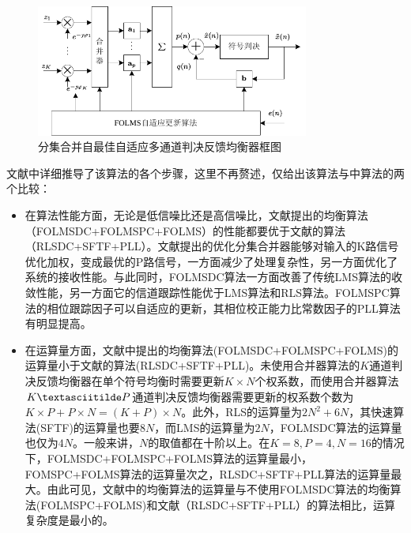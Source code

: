 \begin{figure}[htb]
  \begin{center}
    \includegraphics[width=0.8\textwidth]{images/adaptiveDFE.pdf}
  \end{center}
  \caption{分集合并自最佳自适应多通道判决反馈均衡器框图}
  \label{fig:2.3}
\end{figure}

文献中详细推导了该算法的各个步骤，这里不再赘述，仅给出该算法与中算法的两个比较：
\begin{itemize}
    \item
        在算法性能方面，无论是低信噪比还是高信噪比，文献提出的均衡算法（FOLMSDC+FOLMSPC+FOLMS）的性能都要优于文献的算法（RLSDC+SFTF+PLL）。文献提出的优化分集合并器能够对输入的K路信号优化加权，变成最优的P路信号，一方面减少了处理复杂性，另一方面优化了系统的接收性能。与此同时，FOLMSDC算法一方面改善了传统LMS算法的收敛性能，另一方面它的信道跟踪性能优于LMS算法和RLS算法。FOLMSPC算法的相位跟踪因子可以自适应的更新，其相位校正能力比常数因子的PLL算法有明显提高。
    \item
        在运算量方面，文献中提出的均衡算法(FOLMSDC+FOLMSPC+FOLMS)的运算量小于文献的算法(RLSDC+SFTF+PLL)。未使用合并器算法的$K$通道判决反馈均衡器在单个符号均衡时需要更新$K\times
        N$个权系数，而使用合并器算法$K\textasciitilde
        P$通道判决反馈均衡器需要更新的权系数个数为$K\times P+P\times
        N=(K+P)\times
        N$。此外，RLS的运算量为$2N^2+6N$，其快速算法(SFTF)的运算量也要$8N$，而LMS的运算量为$2N$，FOLMSDC算法的运算量也仅为$4N$。一般来讲，$N$的取值都在十阶以上。在$K=8,P=4,N=16$的情况下，FOLMSDC+FOLMSPC+FOLMS算法的运算量最小，FOMSPC+FOLMS算法的运算量次之，RLSDC+SFTF+PLL算法的运算量最大。由此可见，文献中的均衡算法的运算量与不使用FOLMSDC算法的均衡算法(FOLMSPC+FOLMS)和文献（RLSDC+SFTF+PLL）的算法相比，运算复杂度是最小的。
\end{itemize}
